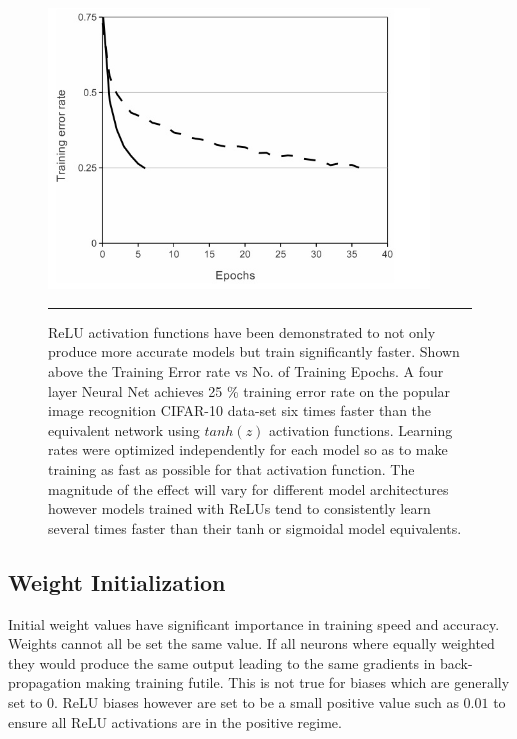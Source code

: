 \begin{figure}[htbp]
	\centering
		\includegraphics[width = 0.9\textwidth]{./Figures/Image_classification_with_DCNNS_relu_vs_tanh.jpg}
		\rule{35em}{0.5pt}
	\caption[ReLU vs tanh]{ReLU activation functions have been demonstrated to not only produce more accurate models but train significantly faster. Shown above the Training Error rate vs No. of Training Epochs. A four layer Neural Net achieves 25 \% training error rate on the popular image recognition CIFAR-10 data-set\citep{krizhevsky2009learning} six times faster than the equivalent network using $tanh(z)$ activation functions. Learning rates were optimized independently for each model so as to make training as fast as possible for that activation function. The magnitude of the effect will vary for different model architectures however models trained with ReLUs tend to consistently learn several times faster than their tanh or sigmoidal model equivalents. }
	\label{fig:Relu_vs_tanh}
\end{figure}



 \subsection{Weight Initialization}

Initial weight values have significant importance in training speed and accuracy\citep{lecun2012efficient}.
Weights cannot all be set the same value.
If all neurons where equally weighted they would produce the same output leading to the same gradients in back-propagation making training futile.
This is not true for biases which are generally set to $0$.
ReLU biases however are set to be a small positive value such as $0.01$ to ensure all ReLU activations are in the positive regime.

